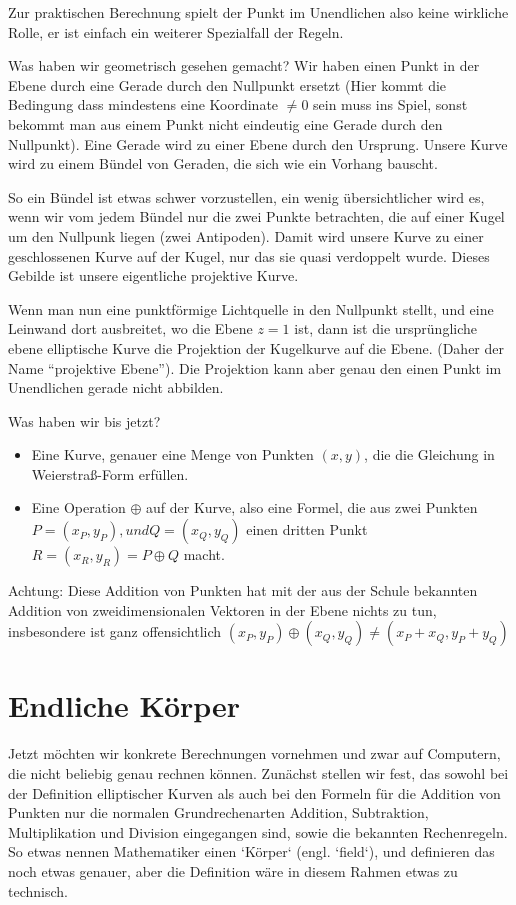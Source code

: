 \documentclass{article}
\begin{document}
Zur praktischen Berechnung spielt der
Punkt im Unendlichen also keine wirkliche Rolle, er ist einfach ein weiterer
Spezialfall der Regeln.


Was haben wir geometrisch gesehen gemacht? Wir haben einen Punkt in der Ebene
durch eine Gerade durch den Nullpunkt ersetzt (Hier kommt die Bedingung dass
mindestens eine Koordinate $\ne 0$ sein muss ins Spiel, sonst bekommt man aus
einem Punkt nicht eindeutig eine Gerade durch den Nullpunkt).  Eine Gerade
wird zu einer Ebene durch den Ursprung. Unsere Kurve wird zu einem Bündel von
Geraden, die sich wie ein Vorhang bauscht.

So ein Bündel ist etwas schwer vorzustellen, ein wenig übersichtlicher wird
es, wenn wir vom jedem Bündel nur die zwei Punkte betrachten, die auf einer
Kugel um den Nullpunk liegen (zwei Antipoden). Damit wird unsere Kurve zu
einer geschlossenen Kurve auf der Kugel, nur das sie quasi verdoppelt
wurde. Dieses Gebilde ist unsere eigentliche projektive Kurve.

Wenn man nun eine punktförmige Lichtquelle in den Nullpunkt stellt, und eine
Leinwand dort ausbreitet, wo die Ebene $z =1$ ist, dann ist die ursprüngliche
ebene elliptische Kurve die Projektion der Kugelkurve auf die Ebene.
(Daher der Name ``projektive Ebene''). Die Projektion kann aber genau den
einen Punkt im Unendlichen gerade nicht abbilden.

Was haben wir bis jetzt?

\begin{itemize}
\item Eine Kurve, genauer eine Menge von Punkten $(x, y)$, die die Gleichung in
  Weierstraß-Form erfüllen.
\item Eine Operation $\oplus$ auf der Kurve, also eine Formel, die aus zwei Punkten
  $P = (x_P, y_P), und Q = (x_Q, y_Q)$ einen dritten Punkt
  $R = (x_R, y_R) = P \oplus Q$ macht.
\end{itemize}
Achtung: Diese Addition von Punkten hat mit der aus der Schule bekannten
Addition von zweidimensionalen Vektoren in der Ebene nichts zu tun,
insbesondere ist ganz offensichtlich
$(x_P, y_P) \oplus (x_Q, y_Q) \ne (x_P + x_Q, y_P + y_Q)$

\section{Endliche Körper}

Jetzt möchten wir konkrete Berechnungen vornehmen und zwar auf Computern,
die nicht beliebig genau rechnen können. Zunächst stellen wir fest, das sowohl
bei der Definition elliptischer Kurven als auch bei den Formeln für die
Addition von Punkten nur die normalen Grundrechenarten Addition, Subtraktion,
Multiplikation und Division eingegangen sind, sowie die bekannten
Rechenregeln. So etwas nennen Mathematiker einen `Körper` (engl. `field`), und
definieren das noch etwas genauer, aber die Definition wäre in diesem Rahmen
etwas zu technisch.
\end{document}
